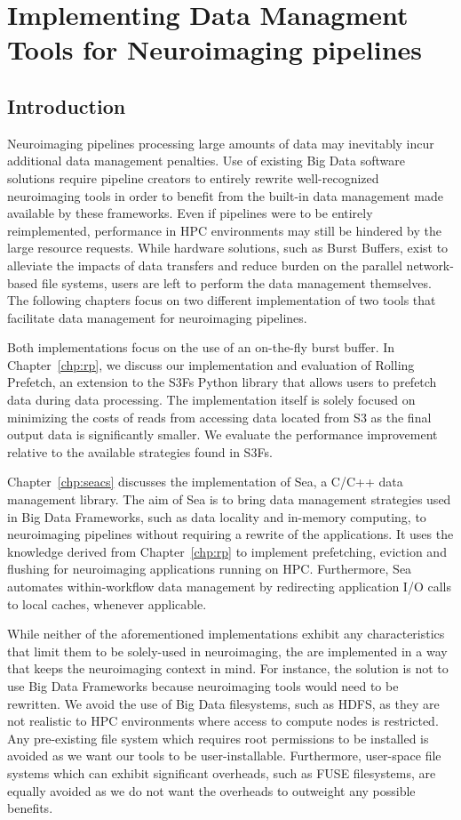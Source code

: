 \part{Implementing Data Managment Tools for Neuroimaging pipelines}
\chapter{Introduction}

Neuroimaging pipelines processing large amounts of data may inevitably incur additional data management penalties.
Use of existing Big Data software solutions require pipeline creators to entirely rewrite well-recognized neuroimaging
tools in order to benefit from the built-in data management made available by these frameworks. Even if pipelines were to
be entirely reimplemented, performance in HPC environments may still be hindered by the large resource requests. 
While hardware solutions, such as Burst Buffers, exist to alleviate the impacts of data transfers and reduce burden on the
parallel network-based file systems, users are left to perform the data management themselves. The following chapters focus on
two different implementation of two tools that facilitate data management for neuroimaging pipelines. 

Both implementations focus on the use of an on-the-fly burst buffer. In Chapter~\ref{chp:rp}, we discuss our implementation and evaluation
of Rolling Prefetch, an extension to the S3Fs Python library that allows users to prefetch data during data processing. The implementation itself
is solely focused on minimizing the costs of reads from accessing data located from S3 as the final output data is significantly smaller. We evaluate
the performance improvement relative to the available strategies found in S3Fs. 

Chapter~\ref{chp:seacs} discusses the implementation of Sea, a C/C++ data management library. The aim of Sea is to bring data management 
strategies used in Big Data Frameworks, such as data locality and in-memory computing, to neuroimaging pipelines without requiring a rewrite
of the applications. It uses the knowledge
derived from Chapter~\ref{chp:rp} to implement prefetching, eviction and flushing for neuroimaging applications running on HPC.
Furthermore, Sea automates within-workflow data management by redirecting application I/O calls to local caches, whenever applicable. 

While neither of the aforementioned implementations exhibit any characteristics that limit them to be solely-used in neuroimaging,
the are implemented in a way that keeps the neuroimaging context in mind. For instance, the solution is not to use Big Data Frameworks because
neuroimaging tools would need to be rewritten. We avoid the use of Big Data filesystems, such as HDFS, as they are not realistic to HPC environments
where access to compute nodes is restricted. Any pre-existing file system which requires root permissions to be installed is avoided as we
want our tools to be user-installable. Furthermore, user-space file systems which can exhibit significant overheads, such as FUSE filesystems, are
equally avoided as we do not want the overheads to outweight any possible benefits.
